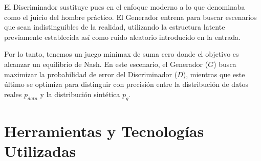 El Discriminador sustituye pues en el enfoque moderno a lo que \cite{markowitz1952} denominaba como el juicio del hombre práctico. El Generador entrena para buscar escenarios que sean indistinguibles de la realidad, utilizando la estructura latente previamente establecida así como ruido aleatorio introducido en la entrada. 

Por lo tanto, tenemos un juego minimax de suma cero donde el objetivo es alcanzar un equilibrio de Nash. En este escenario, el Generador ($G$) busca maximizar la probabilidad de error del Discriminador ($D$), mientras que este último se optimiza para distinguir con precisión entre la distribución de datos reales $p_{data}$ y la distribución sintética $p_g$.

\section{Herramientas y Tecnologías Utilizadas}